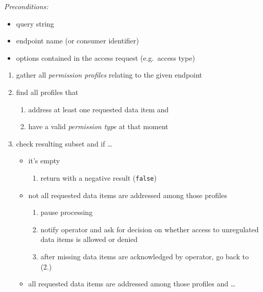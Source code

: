 \documentclass[12pt,english,a4paper,titlepage,cleardoublepage=empty,dottedtoc]{report}
\providecommand{\tightlist}{%
  \setlength{\itemsep}{0pt}\setlength{\parskip}{0pt}}
\begin{document}
\emph{Preconditions:}

\begin{itemize}
\tightlist
\item
  query string
\item
  endpoint name (or consumer identifier)
\item
  options contained in the access request (e.g.~access type)
\end{itemize}

\begin{enumerate}
\def\labelenumi{\arabic{enumi}.}
\item
  gather all \emph{permission profiles} relating to the given endpoint
\item
  find all profiles that

  \begin{enumerate}
  \def\labelenumii{\alph{enumii})}
  \tightlist
  \item
    address at least one requested data item and
  \item
    have a valid \emph{permission type} at that moment
  \end{enumerate}
\item
  check resulting subset and if \ldots{}

  \begin{itemize}
  \tightlist
  \item
    it's empty

    \begin{enumerate}
    \def\labelenumii{\arabic{enumii})}
    \tightlist
    \item
      return with a negative result (\texttt{false})
    \end{enumerate}
  \item
    not all requested data items are addressed among those profiles

    \begin{enumerate}
    \def\labelenumii{\arabic{enumii})}
    \tightlist
    \item
      pause processing
    \item
      notify operator and ask for decision on whether access to
      unregulated data items is allowed or denied
    \item
      after missing data items are acknowledged by operator, go back to
      (2.)
    \end{enumerate}
  \item
    all requested data items are addressed among those profiles and
    \ldots{}


\end{itemize}
\end{enumerate}
\end{document}
